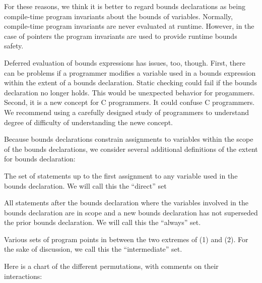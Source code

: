 For these reasons, we think it is better to regard bounds declarations as being
compile-time program invariants about the bounds of variables.   Normally, compile-time
program invariants are never evaluated at runtime.  However, in the case of pointers
the program invariants are used to provide runtime bounds safety.

Deferred evaluation of bounds expressions has issues, too, though. First, there
can be problems if a programmer modifies a variable used in a bounds expression
within the extent of a bounds declaration.  Static checking could fail if the
bounds declaration no longer holds.   This would be unexpected behavior for
progammers.  Second, it is a new concept for C programmers.   It could confuse C
programmers.  We recommend using a carefully designed study of programmers to understand 
degree of difficulty of understanding the newe concept.

Because bounds declarations constrain assignments to variables within the scope
of the bounds declarations, we consider several additional definitions of the
extent for bounds declaration:

\begin{compactitem}
    \item The set of statements up to the first assignment to any variable
     used in the bounds declaration. We will call this the ``direct'' set
    \item
      All statements after the bounds declaration where the variables involved in
      the bounds declaration are in scope and a new bounds declaration has not superseded
      the prior bounds declaration. We will call this the ``always'' set.
    \item
      Various sets of program points in between the two extremes of (1) and (2).
      For the sake of discussion, we call this the ``intermediate'' set.
\end{compactitem}

Here is a chart of the different permutations, with comments on their interactions:

